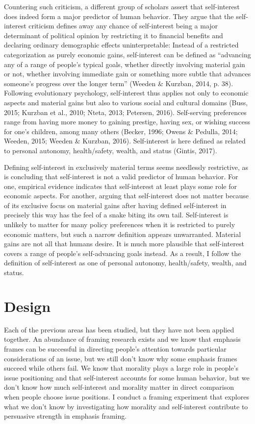 \documentclass[12pt,econ]{sources/authesis}
\begin{document}
Countering such criticism, a different group of scholars assert that self-interest does indeed form a major predictor of human behavior. They argue that the self-interest criticism defines away any chance of self-interest being a major determinant of political opinion by restricting it to financial benefits and declaring ordinary demographic effects uninterpretable: Instead of a restricted categorization as purely economic gains, self-interest can be defined as ``advancing any of a range of people's typical goals, whether directly involving material gain or not, whether involving immediate gain or something more subtle that advances someone's progress over the longer term'' (Weeden \& Kurzban, 2014, p. 38). Following evolutionary psychology, self-interest thus applies not only to economic aspects and material gains but also to various social and cultural domains (Buss, 2015; Kurzban et al., 2010; Nteta, 2013; Petersen, 2016). Self-serving preferences range from having more money to gaining prestige, having sex, or wishing success for one's children, among many others (Becker, 1996; Owens \& Pedulla, 2014; Weeden, 2015; Weeden \& Kurzban, 2016). Self-interest is here defined as related to personal autonomy, health/safety, wealth, and status (Gintis, 2017).

Defining self-interest in exclusively material terms seems needlessly restrictive, as is concluding that self-interest is not a valid predictor of human behavior. For one, empirical evidence indicates that self-interest at least plays some role for economic aspects. For another, arguing that self-interest does not matter because of its exclusive focus on material gains after having defined self-interest in precisely this way has the feel of a snake biting its own tail. Self-interest is unlikely to matter for many policy preferences when it is restricted to purely economic matters, but such a narrow definition appears unwarranted. Material gains are not all that humans desire. It is much more plausible that self-interest covers a range of people's self-advancing goals instead. As a result, I follow the definition of self-interest as one of personal autonomy, health/safety, wealth, and status.

\hypertarget{framing-design}{%
\section{Design}\label{framing-design}}

Each of the previous areas has been studied, but they have not been applied together. An abundance of framing research exists and we know that emphasis frames can be successful in directing people's attention towards particular considerations of an issue, but we still don't know why some emphasis frames succeed while others fail. We know that morality plays a large role in people's issue positioning and that self-interest accounts for some human behavior, but we don't know how much self-interest and morality matter in direct comparison when people choose issue positions. I conduct a framing experiment that explores what we don't know by investigating how morality and self-interest contribute to persuasive strength in emphasis framing.
\end{document}
